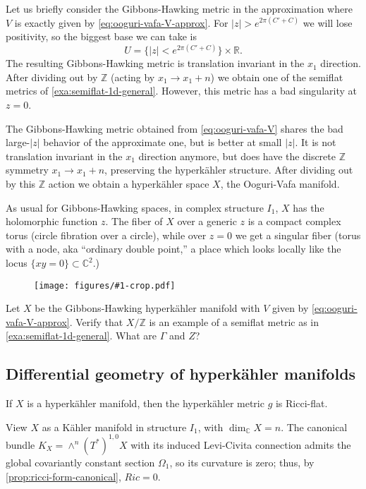 \documentclass[12pt,letterpaper,reqno]{article}
\numberwithin{equation}{section}
\newcommand{\R}{\ensuremath{\mathbb R}}
\newcommand{\C}{\ensuremath{\mathbb C}}
\newcommand{\Z}{\ensuremath{\mathbb Z}}
\newcommand{\kahler}{K\"ahler\xspace}
\newcommand{\hk}{hyperk\"ahler\xspace}
\newcommand{\Hk}{Hyperk\"ahler\xspace}
\newcommand{\abs}[1]{\lvert#1\rvert}
\newcommand{\insfig}[2]{\begin{figure}[htbp] \centering \texttt{[image: figures/\#1-crop.pdf]} \label{fig:#1} \end{figure}}
\newcommand{\fixme}[1]{{\color{blue}{[#1]}}}
\begin{document}
\begin{example}
Let us briefly consider the Gibbons-Hawking metric in the approximation
where $V$ is exactly given by \eqref{eq:ooguri-vafa-V-approx}.
For $\abs{z} > e^{2 \pi(C' + C)}$
we will lose positivity, so the biggest base we can take is 
\begin{equation}
U = \{\abs{z} < e^{2 \pi(C' + C)}\} \times \R. 
\end{equation}
The resulting Gibbons-Hawking metric is translation
invariant in the $x_1$ direction. After dividing out by 
$\Z$ (acting by $x_1 \to x_1 + n$) we obtain
one of the semiflat metrics of \autoref{exa:semiflat-1d-general}.
However, this metric has a bad singularity at $z=0$.

The Gibbons-Hawking metric obtained from \eqref{eq:ooguri-vafa-V} 
shares the bad large-$\abs{z}$ behavior
of the approximate one, but is better at small $\abs{z}$. It is not 
translation invariant in the $x_1$ direction anymore, but does 
have the discrete $\Z$ symmetry $x_1 \to x_1 + n$, preserving
the \hk structure.
After dividing out by this $\Z$ action we obtain a \hk 
space $X$, the Ooguri-Vafa manifold.

As usual for Gibbons-Hawking spaces, 
in complex structure $I_1$, $X$ has the holomorphic function $z$. 
The fiber of $X$ over a generic $z$ is a compact complex torus (circle
fibration over a circle), while over $z=0$ we get a singular
fiber (torus with a node, aka ``ordinary double point,'' a place
which looks locally like the locus $\{xy=0\} \subset \C^2$.)

\fixme{tricky point: choice of $U(1)$ action when we glue}

\fixme{describe twistor picture?}

\end{example}

\insfig{higgs-bundles-8}{0.92}

\begin{exercise} Let $X$ be the Gibbons-Hawking
\hk manifold with $V$ given by \eqref{eq:ooguri-vafa-V-approx}.
Verify that $X / \Z$ is an example of a semiflat metric as in 
\autoref{exa:semiflat-1d-general}. What are $\Gamma$ and $Z$?
\end{exercise}

\subsection{Differential geometry of \hk manifolds}

\begin{prop}[\Hk manifolds are Ricci-flat] \label{prop:hk-ricci-flat}
If $X$ is a \hk manifold,
then the \hk metric $g$ is Ricci-flat.
\end{prop}
\begin{pf} View $X$ as a
\kahler manifold in structure $I_1$, with $\dim_\C X = n$. 
The canonical bundle $K_X = \wedge^n (T^*)^{1,0} X$
with its induced Levi-Civita connection
admits the global covariantly constant section $\Omega_1$,
so its curvature is zero; thus, by 
\autoref{prop:ricci-form-canonical}, $Ric = 0$.
\end{pf}
\end{document}
